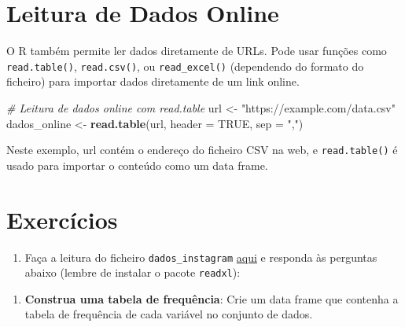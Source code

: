 \documentclass[
]{book}
\newenvironment{Shaded}{\begin{snugshade}}{\end{snugshade}}
\newcommand{\AttributeTok}[1]{\textcolor[rgb]{0.13,0.29,0.53}{#1}}
\newcommand{\CommentTok}[1]{\textcolor[rgb]{0.56,0.35,0.01}{\textit{#1}}}
\newcommand{\ConstantTok}[1]{\textcolor[rgb]{0.56,0.35,0.01}{#1}}
\newcommand{\FunctionTok}[1]{\textcolor[rgb]{0.13,0.29,0.53}{\textbf{#1}}}
\newcommand{\NormalTok}[1]{#1}
\newcommand{\OtherTok}[1]{\textcolor[rgb]{0.56,0.35,0.01}{#1}}
\newcommand{\StringTok}[1]{\textcolor[rgb]{0.31,0.60,0.02}{#1}}
\providecommand{\tightlist}{%
  \setlength{\itemsep}{0pt}\setlength{\parskip}{0pt}}
\begin{document}
\section{Leitura de Dados Online}\label{leitura-de-dados-online}

O R também permite ler dados diretamente de URLs. Pode usar funções como
\texttt{read.table()}, \texttt{read.csv()}, ou \texttt{read\_excel()} (dependendo do formato
do ficheiro) para importar dados diretamente de um link online.

\begin{Shaded}
\begin{Highlighting}[]
\CommentTok{\# Leitura de dados online com read.table}
\NormalTok{url }\OtherTok{\textless{}{-}} \StringTok{"https://example.com/data.csv"}
\NormalTok{dados\_online }\OtherTok{\textless{}{-}} \FunctionTok{read.table}\NormalTok{(url, }\AttributeTok{header =} \ConstantTok{TRUE}\NormalTok{, }\AttributeTok{sep =} \StringTok{","}\NormalTok{)}
\end{Highlighting}
\end{Shaded}

Neste exemplo, url contém o endereço do ficheiro CSV na web, e
\texttt{read.table()} é usado para importar o conteúdo como um data frame.

\section{Exercícios}\label{exercuxedcios-9}

\begin{enumerate}
\def\labelenumi{\arabic{enumi}.}
\tightlist
\item
  Faça a leitura do ficheiro \texttt{dados\_instagram} \href{https://renatorpaula.wixsite.com/renato/laboratorio-estatistica}{aqui} e responda às perguntas abaixo (lembre de instalar o pacote \texttt{readxl}):
\end{enumerate}

\begin{enumerate}
\def\labelenumi{(\alph{enumi})}
\tightlist
\item
  \textbf{Construa uma tabela de frequência}: Crie um data frame que contenha a tabela de frequência de cada variável no conjunto de dados.
\end{enumerate}
\end{document}
